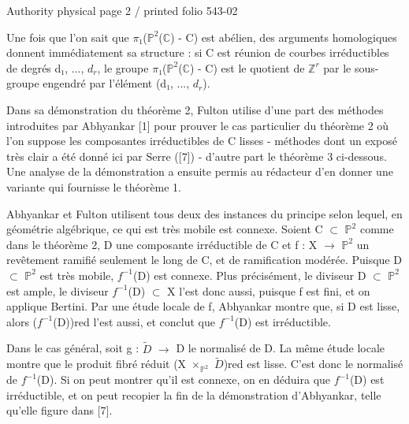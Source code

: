 \documentclass[10pt,a4paper]{article}
\begin{document}
\noindent\begin{adjustbox}{max totalsize={\textwidth}{0.945\textheight},center}
\begin{minipage}{\textwidth}
\noindent\hfill\scriptsize Authority physical page 2 / printed folio 543-02\par\normalsize
\noindent Une fois que l'on sait que \ensuremath{π₁}(\ensuremath{ℙ^2}(\ensuremath{ℂ}) - C) est abélien, des arguments homologiques donnent immédiatement sa structure : si C est réunion de courbes irréductibles de degrés d\ensuremath{₁}, ..., \ensuremath{d_r}, le groupe \ensuremath{π₁}(\ensuremath{ℙ^2}(\ensuremath{ℂ}) - C) est le quotient de \ensuremath{ℤ^r} par le sous-groupe engendré par l'élément (d\ensuremath{₁}, ..., \ensuremath{d_r}).\par\smallskip
\noindent Dans sa démonstration du théorème 2, Fulton utilise d'une part des méthodes introduites par Abhyankar [1] pour prouver le cas particulier du théorème 2 où l'on suppose les composantes irréductibles de C lisses - méthodes dont un exposé très clair a été donné ici par Serre ([7]) - d'autre part le théorème 3 ci-dessous. Une analyse de la démonstration a ensuite permis au rédacteur d'en donner une variante qui fournisse le théorème 1.\par\smallskip
\noindent Abhyankar et Fulton utilisent tous deux des instances du principe selon lequel, en géométrie algébrique, ce qui est très mobile est connexe. Soient C \ensuremath{⊂} \ensuremath{ℙ^2} comme dans le théorème 2, D une composante irréductible de C et f : X \ensuremath{→} \ensuremath{ℙ^2} un revêtement ramifié seulement le long de C, et de ramification modérée. Puisque D \ensuremath{⊂} \ensuremath{ℙ^2} est très mobile, \ensuremath{f^{-1}}(D) est connexe. Plus précisément, le diviseur D \ensuremath{⊂} \ensuremath{ℙ^2} est ample, le diviseur \ensuremath{f^{-1}}(D) \ensuremath{⊂} X l'est donc aussi, puisque f est fini, et on applique Bertini. Par une étude locale de f, Abhyankar montre que, si D est lisse, alors (\ensuremath{f^{-1}}(D))red l'est aussi, et conclut que \ensuremath{f^{-1}}(D) est irréductible.\par\smallskip
\noindent Dans le cas général, soit g : \ensuremath{\widetilde{D}} \ensuremath{→} D le normalisé de D. La même étude locale montre que le produit fibré réduit (X \ensuremath{×_{ℙ^2}} \ensuremath{\widetilde{D}})red est lisse. C'est donc le normalisé de \ensuremath{f^{-1}}(D). Si on peut montrer qu'il est connexe, on en déduira que \ensuremath{f^{-1}}(D) est irréductible, et on peut recopier la fin de la démonstration d'Abhyankar, telle qu'elle figure dans [7].\par\smallskip

\end{minipage}
\end{adjustbox}
\end{document}
